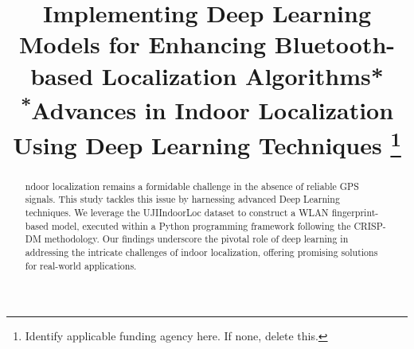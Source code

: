 \documentclass[conference]{IEEEtran}
\begin{document}
\title{Implementing Deep Learning Models for Enhancing Bluetooth-based Localization Algorithms*\\
{\footnotesize \textsuperscript{*}Advances in Indoor Localization Using Deep Learning Techniques}
\thanks{Identify applicable funding agency here. If none, delete this.}
}

\author{
\and
{}
\and
{}
\and
{}
}

\maketitle

\begin{abstract}
ndoor localization remains a formidable challenge in the absence of reliable GPS signals. This study tackles this issue by harnessing advanced Deep Learning techniques. We leverage the UJIIndoorLoc dataset to construct a WLAN fingerprint-based model, executed within a Python programming framework following the CRISP-DM methodology. Our findings underscore the pivotal role of deep learning in addressing the intricate challenges of indoor localization, offering promising solutions for real-world applications.
\end{abstract}
\end{document}
